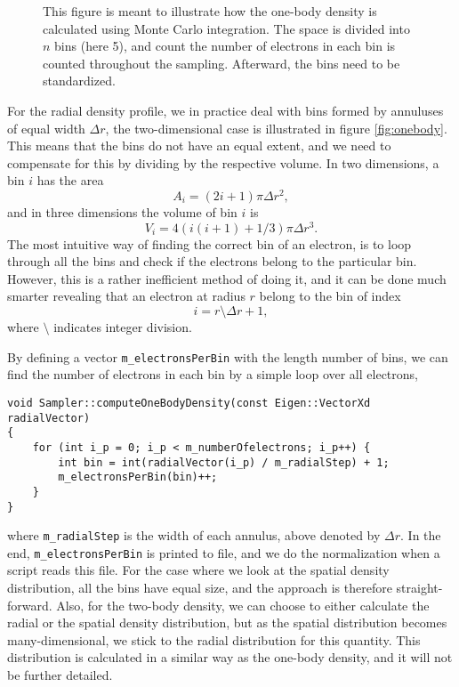 \begin{figure}
	\centering
	
	\caption{This figure is meant to illustrate how the one-body density is calculated using Monte Carlo integration. The space is divided into $n$ bins (here 5), and count the number of electrons in each bin is counted throughout the sampling. Afterward, the bins need to be standardized.}
	\label{fig:onebody}
\end{figure}
For the radial density profile, we in practice deal with bins formed by annuluses of equal width $\Delta r$, the two-dimensional case is illustrated in figure \eqref{fig:onebody}. This means that the bins do not have an equal extent, and we need to compensate for this by dividing by the respective volume. In two dimensions, a bin $i$ has the area
\begin{equation}
A_i=(2i+1)\pi \Delta r^2,
\end{equation}
and in three dimensions the volume of bin $i$ is
\begin{equation}
V_i=4(i(i+1)+1/3)\pi \Delta r^3.
\end{equation}
The most intuitive way of finding the correct bin of an electron, is to loop through all the bins and check if the electrons belong to the particular bin. However, this is a rather inefficient method of doing it, and it can be done much smarter revealing that an electron at radius $r$ belong to the bin of index
\begin{equation}
i=r\setminus \Delta r + 1,
\end{equation}
where $\setminus$ indicates integer division. 

By defining a vector \lstinline|m_electronsPerBin| with the length number of bins, we can find the number of electrons in each bin by a simple loop over all electrons,
\begin{lstlisting}
void Sampler::computeOneBodyDensity(const Eigen::VectorXd radialVector)
{
	for (int i_p = 0; i_p < m_numberOfelectrons; i_p++) {
		int bin = int(radialVector(i_p) / m_radialStep) + 1;
		m_electronsPerBin(bin)++;
	}
}
\end{lstlisting}
where \lstinline|m_radialStep| is the width of each annulus, above denoted by $\Delta r$. In the end, \lstinline|m_electronsPerBin| is printed to file, and we do the normalization when a script reads this file. For the case where we look at the spatial density distribution, all the bins have equal size, and the approach is therefore straight-forward. Also, for the two-body density, we can choose to either calculate the radial or the spatial density distribution, but as the spatial distribution becomes many-dimensional, we stick to the radial distribution for this quantity. This distribution is calculated in a similar way as the one-body density, and it will not be further detailed. 

